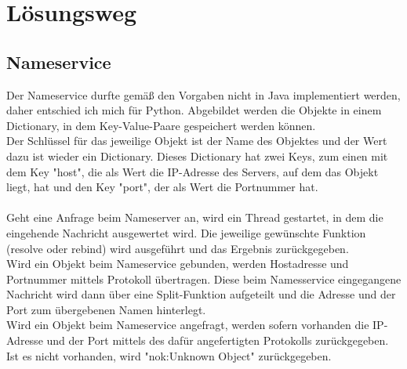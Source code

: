 %
\chapter{Lösungsweg}

\section{Nameservice}
Der Nameservice durfte gemäß den Vorgaben nicht in Java implementiert werden, daher entschied ich mich für Python.
Abgebildet werden die Objekte in einem Dictionary, in dem Key-Value-Paare gespeichert werden können.\\
Der Schlüssel für das jeweilige Objekt ist der Name des Objektes und der Wert dazu ist wieder ein Dictionary. Dieses Dictionary hat zwei Keys, zum einen mit dem Key "host", die als Wert die IP-Adresse des Servers, auf dem das Objekt liegt, hat und den Key "port", der als Wert die Portnummer hat.\\
\\Geht eine Anfrage beim Nameserver an, wird ein Thread gestartet, in dem die eingehende Nachricht ausgewertet wird. Die jeweilige gewünschte Funktion (resolve oder rebind) wird ausgeführt und das Ergebnis zurückgegeben.\\
Wird ein Objekt beim Nameservice gebunden, werden Hostadresse und Portnummer mittels Protokoll übertragen. Diese beim Namesservice eingegangene Nachricht wird dann über eine Split-Funktion aufgeteilt und die Adresse und der Port zum übergebenen Namen hinterlegt.\\
Wird ein Objekt beim Nameservice angefragt, werden sofern vorhanden die IP-Adresse und der Port mittels des dafür angefertigten Protokolls zurückgegeben. Ist es nicht vorhanden, wird "nok:Unknown Object" zurückgegeben.\\

